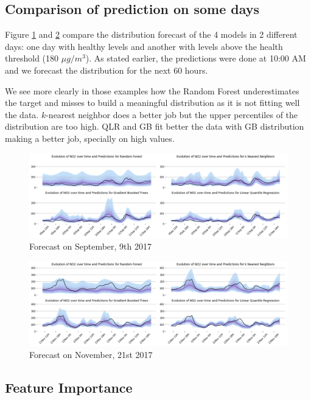 \documentclass[a4paper,twocolumn,5p]{elsarticle}
\begin{document}
\subsection{Comparison of prediction on some days}

Figure \ref{figure:evoday1} and 
\ref{figure:evoday2} 
compare the distribution forecast of the 4 models 
in 2 different days: one day with healthy levels and another 
with levels above the health threshold (180 $\mu g / m^3$).
As stated earlier, the predictions were done 
at 10:00 AM and we forecast the distribution 
for the next 60 hours.

We see more clearly in those examples how the Random Forest 
underestimates the target and misses to build a meaningful distribution as 
it is not fitting well the data.
$k$-nearest neighbor does a better job but the upper percentiles of 
the distribution are too high.
QLR and GB fit better the data with GB distribution making a better job, 
specially on high values.

\begin{figure}
  \centering
  \includegraphics[width=1\textwidth]{evoday1}
  \caption{Forecast on September, 9th 2017}
  \label{figure:evoday1} 
\end{figure}

\begin{figure}
  \centering
  \includegraphics[width=1\textwidth]{evoday2}
  \caption{Forecast on November, 21st 2017}
  \label{figure:evoday2} 
\end{figure}

\subsection{Feature Importance}
\end{document}
